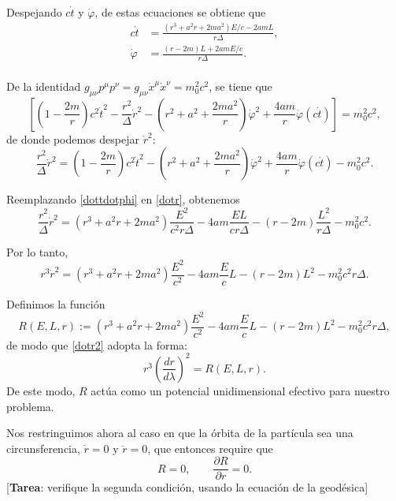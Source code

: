 Despejando $c\dot{t}$ y $\dot{\varphi}$, de estas ecuaciones se obtiene que
\begin{equation}
\begin{aligned}
c\dot{t}&=\frac{(r^3+a^2r+2ma^2)E/c-2amL}{r\Delta},\\ \label{dottdotphi}
\dot{\varphi}&=\frac{(r-2m)L+2amE/c}{r\Delta}.\\
\end{aligned}
\end{equation}

De la identidad $g_{\mu \nu}p^{\mu} p^{\nu}=g_{\mu \nu}\dot{x}^{\mu}\dot{x}^{\nu}=m_0^2c^2$, se tiene que 
\begin{equation}\label{pp=m2c2}
\left[\left(1-\frac{2m}{r}\right)c^2\dot{t}^2-\frac{r^2}{\Delta}\dot{r}^2-\left(r^2+a^2+\frac{2ma^2}{r}\right)\dot{\varphi}^2
+\frac{4am}{r}\dot{\varphi}(c\dot{t}) \right]=m_0^2c^2,
\end{equation}
de donde podemos despejar $\dot{r}^2$:
\begin{equation}\label{dotr}
\frac{r^2}{\Delta}\dot{r}^2=\left(1-\frac{2m}{r}\right)c^2\dot{t}^2-\left(r^2+a^2+\frac{2ma^2}{r}\right)\dot{\varphi}^2
+\frac{4am}{r}\dot{\varphi}(c\dot{t}) -m_0^2c^2.
\end{equation}

Reemplazando \eqref{dottdotphi} en \eqref{dotr}, obtenemos
\begin{equation}
\frac{r^2}{\Delta}\dot{r}^2=\left( r^3+a^2r+2ma^2\right)\frac{E^2}{c^2r\Delta}-4am\frac{EL}{cr\Delta}-\left(r-2m\right)\frac{L^2}{r\Delta}-m_0^2c^2.
\end{equation}

Por lo tanto,
\begin{equation}\label{dotr2}
r^3\dot{r}^2=\left( r^3+a^2r+2ma^2\right)\frac{E^2}{c^2}-4am\frac{E}{c}L-\left(r-2m\right)L^2-m_0^2c^2r\Delta .
\end{equation}

Definimos la función
\begin{equation}\label{R}
R(E,L,r):=\left( r^3+a^2r+2ma^2\right)\frac{E^2}{c^2}-4am\frac{E}{c}L-\left(r-2m\right)L^2-m_0^2c^2r\Delta,
\end{equation}
de modo que \eqref{dotr2} adopta la forma:
\begin{equation}
r^3\left(\frac{dr}{d\lambda}\right)^2=R(E,L,r).
\end{equation}
De este modo, $R$ actúa como un potencial unidimensional efectivo para nuestro problema.


Nos restringuimos ahora al caso en que la órbita de la partícula sea una circunsferencia, $\dot{r}=0$ y $\ddot{r}=0$, que entonces require que 
\begin{equation}
R=0, \qquad \frac{\partial R}{\partial r}=0.
\end{equation}
[\textbf{Tarea}: verifique la segunda condición, usando la ecuación de la geodésica]

